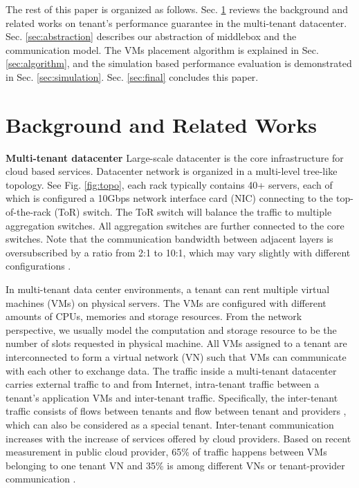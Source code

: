 \documentclass[review]{elsarticle}
\begin{document}
The rest of this paper is organized as follows. Sec. \ref{sec:background} reviews the background and related works on tenant's performance guarantee in the multi-tenant datacenter. Sec. \ref{sec:abstraction} describes our abstraction of middlebox and the communication model. The VMs placement algorithm is explained in Sec. \ref{sec:algorithm}, and the simulation based performance evaluation is demonstrated in Sec. \ref{sec:simulation}. Sec. \ref{sec:final} concludes this paper.

\section{Background and Related Works}\label{sec:background}
\textbf{Multi-tenant datacenter }
Large-scale datacenter is the core infrastructure for cloud based services. Datacenter network is organized in a multi-level tree-like topology. See Fig. \ref{fig:topo}, each rack typically contains 40+ servers, each of which is configured a 10Gbps network interface card (NIC) connecting to the top-of-the-rack (ToR) switch. The ToR switch will balance the traffic to multiple aggregation switches. All aggregation switches are further connected to the core switches. Note that the communication bandwidth between adjacent layers is oversubscribed by a ratio from 2:1 to 10:1, which may vary slightly with different configurations \cite{B13cta, williamson2010has}.

In multi-tenant data center environments, a tenant can rent multiple virtual machines (VMs) on physical servers. The VMs are configured with different amounts of CPUs, memories and storage resources. From the network perspective, we usually model the computation and storage resource to be the number of slots requested in physical machine. All VMs assigned to a tenant are interconnected to form a virtual network (VN) such that VMs can communicate with each other to exchange data. The traffic inside a multi-tenant datacenter carries external traffic to and from Internet, intra-tenant traffic between a tenant's application VMs and inter-tenant traffic. Specifically, the inter-tenant traffic consists of flows between tenants and flow between tenant and providers \cite{B13cta}, which can also be considered as a special tenant. Inter-tenant communication increases with the increase of services offered by cloud providers. Based on recent measurement in public cloud provider, 65\% of traffic happens between VMs belonging to one tenant VN and 35\% is among different VNs or tenant-provider communication \cite{B13cta, P13acs}.
\end{document}
